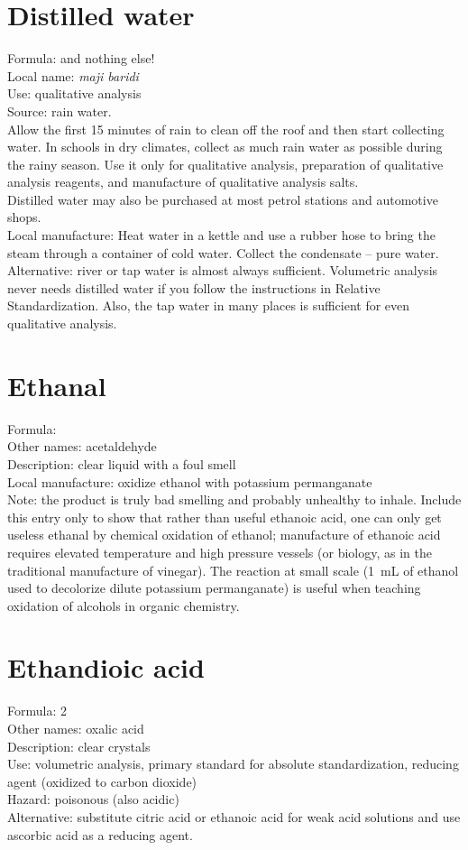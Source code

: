 \section{Distilled water}
Formula:  and nothing else!\\
Local name: \textit{maji baridi}\\
Use: qualitative analysis\\
Source: rain water.\\
Allow the first 15 minutes of rain to clean off the roof 
and then start collecting water. 
In schools in dry climates, 
collect as much rain water as possible during the rainy season. 
Use it only for qualitative analysis, 
preparation of qualitative analysis reagents, 
and manufacture of qualitative analysis salts.\\ 
Distilled water may also be purchased at most petrol stations 
and automotive shops.\\
Local manufacture: Heat water in a kettle 
and use a rubber hose to bring the steam through a container of cold water. 
Collect the condensate -- pure water.\\
Alternative: river or tap water is almost always sufficient. 
Volumetric analysis never needs distilled water 
if you follow the instructions in Relative Standardization. 
Also, 
the tap water in many places is sufficient for even qualitative analysis.

\section{Ethanal}
\label{sec:ethanal}
Formula: \\
Other names: acetaldehyde\\
Description: clear liquid with a foul smell\\
Local manufacture: oxidize ethanol with potassium permanganate\\
Note: the product is truly bad smelling and probably unhealthy to inhale. 
Include this entry only to show that rather than useful ethanoic acid, 
one can only get useless ethanal by chemical oxidation of ethanol; 
manufacture of ethanoic acid requires elevated temperature 
and high pressure vessels (or biology, 
as in the traditional manufacture of vinegar). 
The reaction at small scale 
(1~mL of ethanol used to decolorize dilute potassium permanganate) 
is useful when teaching oxidation of alcohols in organic chemistry.

\section{Ethandioic acid}
Formula:  2\\
Other names: oxalic acid\\
Description: clear crystals\\
Use: volumetric analysis, 
primary standard for absolute standardization, 
reducing agent (oxidized to carbon dioxide)\\
Hazard: poisonous (also acidic)\\
Alternative: substitute citric acid or ethanoic acid 
for weak acid solutions and use ascorbic acid as a reducing agent.

